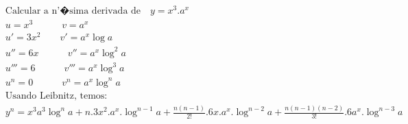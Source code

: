 \begin{ex}
\begin{align}
&\text{Calcular a n'�sima derivada de} \quad y=x^3.a^x\nonumber\\
&u=x^3 \quad\quad\quad v=a^x\nonumber\\
&u'=3x^2 \quad\quad v'=a^{x}\log{a}\nonumber\\
&u''=6x\quad\quad\quad v''=a^{x}\log^2{a}\nonumber\\
&u'''=6 \quad\quad\quad v'''=a^{x}\log^3{a}\nonumber\\
&u^{n}=0 \quad\quad\quad v^{n}=a^{x}\log^{n}{a}\nonumber\\
&\text{Usando Leibnitz, temos:}\nonumber\\
&y^{n}=x^3a^3\log^{n}{a}+n.3x^2.a^{x}.\log^{n-1}{a}+\frac{n(n-1)}{2!}.6x.a^{x}.\log^{n-2}{a}+\frac{n(n-1)(n-2)}{3!}.6a^{x}.\log^{n-3}{a}\nonumber
\end{align}
\end{ex}